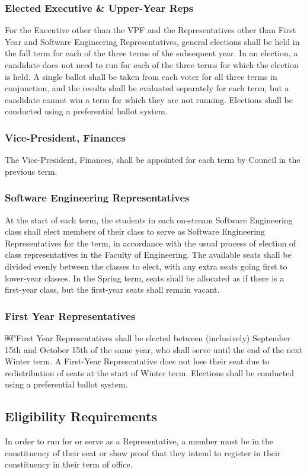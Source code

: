 \subsubsection{Elected Executive \& Upper-Year Reps}
For the Executive other than the VPF and the Representatives other than First
Year and Software Engineering Representatives, general elections shall be held
in the fall term for each of the three terms of the subsequent year. In an
election, a candidate does not need to run for each of the three terms for which
the election is held. A single ballot shall be taken from each voter for all
three terms in conjunction, and the results shall be evaluated separately for
each term, but a candidate cannot win a term for which they are not running.
Elections shall be conducted using a preferential ballot system.

\subsubsection{Vice-President, Finances}
The Vice-President, Finances, shall be appointed for each term by Council in the
previous term.

\subsubsection{Software Engineering Representatives}
At the start of each term, the students in each on-stream Software Engineering
class shall elect members of their class to serve as Software Engineering
Representatives for the term, in accordance with the usual process of election
of class representatives in the Faculty of Engineering. The available seats
shall be divided evenly between the classes to elect, with any extra seats going
first to lower-year classes. In the Spring term, seats shall be allocated as if
there is a first-year class, but the first-year seats shall remain vacant.

\subsubsection{First Year Representatives}
￼"First Year Representatives shall be elected between (inclusively) September 15th and October 15th of the same year, who shall serve until the end of the next Winter term. A First-Year Representative does not lose
their seat due to redistribution of seats at the start of Winter term. Elections
shall be conducted using a preferential ballot system.

\subsection{Eligibility Requirements}
In order to run for or serve as a Representative, a member must be in the
constituency of their seat or show proof that they intend to register in their
constituency in their term of office.

